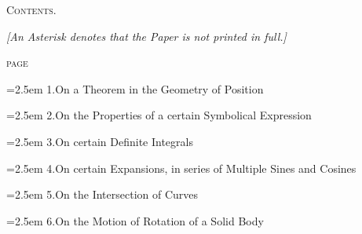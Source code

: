 \documentclass[11pt]{article}
\begin{document}
\setlength{\parindent}{1.5em}


\begin{center}
{\Large\scshape Contents.}
\end{center}

\medskip
\begin{center}
\textit{[An Asterisk denotes that the Paper is not printed in full.]}
\end{center}

\bigskip

\noindent\hfill\textsc{page}\par
\noindent\hangindent=2.5em
\phantom{*}1.\quad On a Theorem in the Geometry of Position\par
\hspace{1.5em}{\small Camb.\ Math.\ Jour.\ t.~ii.\ (1841), pp.~267--271 \hfill (1841)}\par

\noindent\hangindent=2.5em
\phantom{*}2.\quad On the Properties of a certain Symbolical Expression\par
\hspace{1.5em}{\small Camb.\ Math.\ Jour.\ t.~iii.\ (1843), pp.~62--71 \hfill (1842)}\par

\noindent\hangindent=2.5em
\phantom{*}3.\quad On certain Definite Integrals\par
\hspace{1.5em}{\small Camb.\ Math.\ Jour.\ t.~iii.\ (1843), pp.~138--144 \hfill (1842)}\par

\noindent\hangindent=2.5em
\phantom{*}4.\quad On certain Expansions, in series of Multiple Sines and Cosines\par
\hspace{1.5em}{\small Camb.\ Math.\ Jour.\ t.~iii.\ (1843), pp.~162--167 \hfill (1842)}\par

\noindent\hangindent=2.5em
\phantom{*}5.\quad On the Intersection of Curves\par
\hspace{1.5em}{\small Camb.\ Math.\ Jour.\ t.~iii.\ (1843), pp.~211--213 \hfill (1843)}\par

\noindent\hangindent=2.5em
\phantom{*}6.\quad On the Motion of Rotation of a Solid Body\par
\hspace{1.5em}{\small Camb.\ Math.\ Jour.\ t.~iii.\ (1843), pp.~224--232 \hfill (1843)}\par
\end{document}
